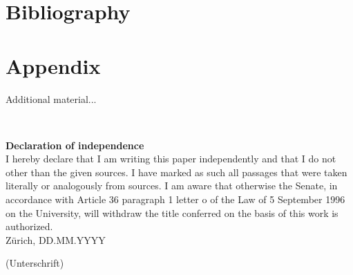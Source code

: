 \documentclass[12pt,a4paper]{article}
\begin{document}
\blindtext

\section{Bibliography}

\printbibliography

\begin{description}
\item
\end{description}

\vspace{0.8cm}

\newpage
\appendix
\section{Appendix }

Additional material...

\newpage

\thispagestyle{empty}

\ \vspace{1cm}

{\bf \huge Declaration of independence} \\[0.4cm]

I hereby declare that I am writing this paper independently and that I do not
other than the given sources. I have marked as such all passages that were taken literally or analogously from sources. I am aware that otherwise the Senate, in accordance with Article 36 paragraph 1 letter o of the Law of 5 September 1996 on the University, will withdraw the title conferred on the basis of this work
is authorized.\\[0.5cm]

Zürich, DD.MM.YYYY \hspace{5cm} \hrulefill \hspace{1cm} \\[0cm]
\begin{minipage}[h]{15cm} \hspace{10.5cm}  {\small (Unterschrift)}
\end{minipage}
\end{document}
